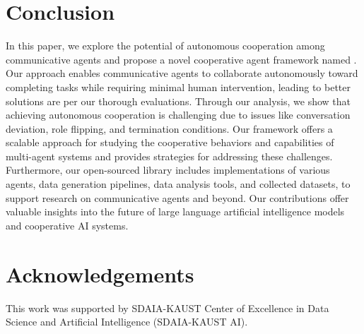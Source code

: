 \vspace{-0.25cm}\section{Conclusion}\label{sec:conclusion}
\vspace{-0.25cm}

In this paper, we explore the potential of autonomous cooperation among communicative agents and propose a novel cooperative agent framework named \RP. Our approach enables communicative agents to collaborate autonomously toward completing tasks while requiring minimal human intervention, leading to better solutions are per our thorough evaluations. Through our analysis, we show that achieving autonomous cooperation is challenging due to issues like conversation deviation, role flipping, and termination conditions. Our framework offers a scalable approach for studying the cooperative behaviors and capabilities of multi-agent systems and provides strategies for addressing these challenges. Furthermore, our open-sourced library includes implementations of various agents, data generation pipelines, data analysis tools, and collected datasets, to support research on communicative agents and beyond. Our contributions offer valuable insights into the future of large language artificial intelligence models and cooperative AI systems.

\vspace{-0.25cm}
\section{Acknowledgements}
\vspace{-0.25cm}
This work was supported by SDAIA-KAUST Center of Excellence in Data Science and Artificial Intelligence (SDAIA-KAUST AI).